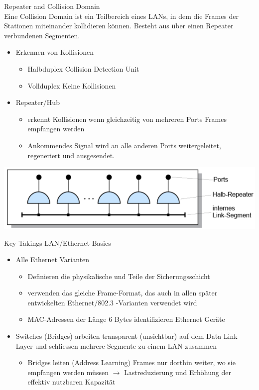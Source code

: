 \begin{concept}{Repeater and Collision Domain}\\
    Eine Collision Domain ist ein Teilbereich eines LANs, in dem die Frames der Stationen miteinander kollidieren können.
    Besteht aus über einen Repeater verbundenen Segmenten.
    \begin{itemize}
        \item Erkennen von Kollisionen
        \begin{itemize}
            \item Halbduplex Collision Detection Unit
            \item Vollduplex Keine Kollisionen
        \end{itemize}
        
        \item Repeater/Hub
        \begin{itemize}
            \item erkennt Kollisionen wenn gleichzeitig von mehreren Ports Frames empfangen werden
            \item Ankommendes Signal wird an alle anderen Ports weitergeleitet, regeneriert und ausgesendet. 
        \end{itemize}
    \end{itemize}
        \includegraphics[width=0.75\linewidth]{images/repeater_hub.png}
\end{concept}



\begin{KR}{Key Takings LAN/Ethernet Basics}
    \begin{itemize}
        \item Alle Ethernet Varianten
        \begin{itemize}
            \item Definieren die physikalische und Teile der Sicherungsschicht
            \item verwenden das gleiche Frame-Format, das auch in allen später entwickelten Ethernet/802.3 -Varianten verwendet wird
            \item MAC-Adressen der Länge 6 Bytes identifizieren Ethernet Geräte
        \end{itemize}
        \item Switches (Bridges) arbeiten transparent (unsichtbar) auf dem Data Link Layer und schliessen mehrere Segmente zu einem LAN zusammen
        \begin{itemize}
            \item Bridges leiten (Address Learning) Frames nur dorthin weiter, wo sie empfangen werden müssen $\longrightarrow$ Lastreduzierung und Erhöhung der effektiv nutzbaren Kapazität
        \end{itemize}
    \end{itemize}
\end{KR}

